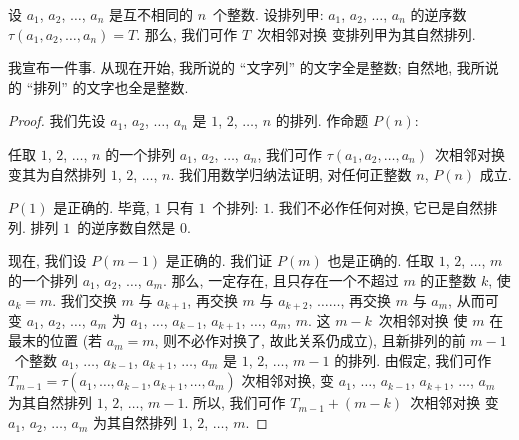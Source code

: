 \documentclass[%
    UTF8,%
    fontset=none,%
    punct=kaiming,%
    zihao=-4,%
    a4paper,%
    oneside,%
]{ctexbook}
\makeatletter
\renewenvironment{quotation}
{\list{}{\listparindent 2\ccwd%
\itemindent\listparindent
\leftmargin\rightmargin
\parsep\z@ \@plus\p@}%
\item\relax}
{\endlist}
\makeatother
\begin{document}
\begin{theorem}
    设 \(a_1\), \(a_2\), \(\dots\), \(a_n\)
    是互不相同的 \(n\)~个整数.
    设排列甲: \(a_1\), \(a_2\), \(\dots\), \(a_n\)
    的逆序数 \(\tau (a_1, a_2, \dots, a_n) = T\).
    那么, 我们可作 \(T\)~次相邻对换%
    变排列甲为其自然排列.
\end{theorem}

我宣布一件事.
从现在开始, 我所说的 ``文字列'' 的文字全是整数;
自然地, 我所说的 ``排列'' 的文字也全是整数.

\begin{proof}
    我们先设 \(a_1\), \(a_2\), \(\dots\), \(a_n\)
    是 \(1\), \(2\), \(\dots\), \(n\) 的排列.
    作命题 \(P(n)\):
    \begin{quotation}
        任取 \(1\), \(2\), \(\dots\), \(n\)
        的一个排列 \(a_1\), \(a_2\), \(\dots\), \(a_n\),
        我们可作 \(\tau (a_1, a_2, \dots, a_n)\)~次相邻对换%
        变其为自然排列 \(1\), \(2\), \(\dots\), \(n\).
    \end{quotation}
    我们用数学归纳法证明,
    对任何正整数 \(n\), \(P(n)\) 成立.

    \(P(1)\) 是正确的.
    毕竟, \(1\) 只有 \(1\)~个排列: \(1\).
    我们不必作任何对换, 它已是自然排列.
    排列 \(1\)~的逆序数自然是 \(0\).

    现在, 我们设 \(P(m-1)\) 是正确的.
    我们证 \(P(m)\) 也是正确的.
    任取 \(1\), \(2\), \(\dots\), \(m\) 的一个排列
    \(a_1\), \(a_2\), \(\dots\), \(a_m\).
    那么, 一定存在, 且只存在一个不超过 \(m\) 的正整数 \(k\),
    使 \(a_k = m\).
    我们交换 \(m\) 与 \(a_{k+1}\),
    再交换 \(m\) 与 \(a_{k+2}\),
    \(\dots \dots\),
    再交换 \(m\) 与 \(a_m\),
    从而可变 \(a_1\), \(a_2\), \(\dots\), \(a_m\)
    为 \(a_1\), \(\dots\), \(a_{k-1}\),
    \(a_{k+1}\), \(\dots\), \(a_m\), \(m\).
    这 \(m - k\)~次相邻对换%
    使 \(m\) 在最末的位置
    (若 \(a_m = m\), 则不必作对换了,
    故此关系仍成立),
    且新排列的前 \(m-1\)~个整数
    \(a_1\), \(\dots\), \(a_{k-1}\),
    \(a_{k+1}\), \(\dots\), \(a_m\)
    是 \(1\), \(2\), \(\dots\), \(m-1\) 的排列.
    由假定, 我们可作
    \(
    T_{m-1} = \tau (a_1, \dots, a_{k-1}, a_{k+1}, \dots, a_m)
    \)
    次相邻对换,
    变 \(a_1\), \(\dots\), \(a_{k-1}\),
    \(a_{k+1}\), \(\dots\), \(a_m\)
    为其自然排列 \(1\), \(2\), \(\dots\), \(m-1\).
    所以, 我们可作 \(T_{m-1} + (m - k)\)~次相邻对换%
    变 \(a_1\), \(a_2\), \(\dots\), \(a_m\)
    为其自然排列 \(1\), \(2\), \(\dots\), \(m\).


\end{proof}
\end{document}
